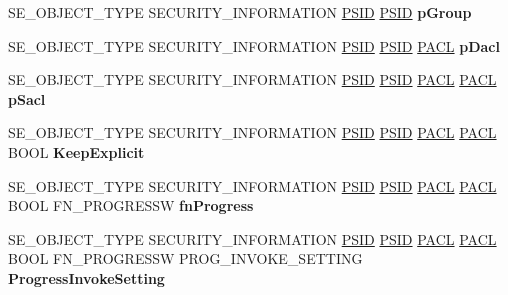 \begin{DoxyCompactItemize}
S\+E\+\_\+\+O\+B\+J\+E\+C\+T\+\_\+\+T\+Y\+PE S\+E\+C\+U\+R\+I\+T\+Y\+\_\+\+I\+N\+F\+O\+R\+M\+A\+T\+I\+ON \hyperlink{struct___s_i_d}{P\+S\+ID} \hyperlink{struct___s_i_d}{P\+S\+ID} {\bfseries p\+Group}
\item 
\mbox{\label{struct___n_t_m_a_r_t_a_a61db2cc6e9a763664329da4c149796c2}} 
S\+E\+\_\+\+O\+B\+J\+E\+C\+T\+\_\+\+T\+Y\+PE S\+E\+C\+U\+R\+I\+T\+Y\+\_\+\+I\+N\+F\+O\+R\+M\+A\+T\+I\+ON \hyperlink{struct___s_i_d}{P\+S\+ID} \hyperlink{struct___s_i_d}{P\+S\+ID} \hyperlink{struct___a_c_l}{P\+A\+CL} {\bfseries p\+Dacl}
\item 
\mbox{\label{struct___n_t_m_a_r_t_a_a284c757a1083cf78ce92b0f45cc11ccb}} 
S\+E\+\_\+\+O\+B\+J\+E\+C\+T\+\_\+\+T\+Y\+PE S\+E\+C\+U\+R\+I\+T\+Y\+\_\+\+I\+N\+F\+O\+R\+M\+A\+T\+I\+ON \hyperlink{struct___s_i_d}{P\+S\+ID} \hyperlink{struct___s_i_d}{P\+S\+ID} \hyperlink{struct___a_c_l}{P\+A\+CL} \hyperlink{struct___a_c_l}{P\+A\+CL} {\bfseries p\+Sacl}
\item 
\mbox{\label{struct___n_t_m_a_r_t_a_a7f2fd040ccc714e9d218554dcde23b1b}} 
S\+E\+\_\+\+O\+B\+J\+E\+C\+T\+\_\+\+T\+Y\+PE S\+E\+C\+U\+R\+I\+T\+Y\+\_\+\+I\+N\+F\+O\+R\+M\+A\+T\+I\+ON \hyperlink{struct___s_i_d}{P\+S\+ID} \hyperlink{struct___s_i_d}{P\+S\+ID} \hyperlink{struct___a_c_l}{P\+A\+CL} \hyperlink{struct___a_c_l}{P\+A\+CL} B\+O\+OL {\bfseries Keep\+Explicit}
\item 
\mbox{\label{struct___n_t_m_a_r_t_a_a2c616bccb7c92ddf205d409343c3cbea}} 
S\+E\+\_\+\+O\+B\+J\+E\+C\+T\+\_\+\+T\+Y\+PE S\+E\+C\+U\+R\+I\+T\+Y\+\_\+\+I\+N\+F\+O\+R\+M\+A\+T\+I\+ON \hyperlink{struct___s_i_d}{P\+S\+ID} \hyperlink{struct___s_i_d}{P\+S\+ID} \hyperlink{struct___a_c_l}{P\+A\+CL} \hyperlink{struct___a_c_l}{P\+A\+CL} B\+O\+OL F\+N\+\_\+\+P\+R\+O\+G\+R\+E\+S\+SW {\bfseries fn\+Progress}
\item 
\mbox{\label{struct___n_t_m_a_r_t_a_aac5c9f890a55fbaec1aefb7c76e86f92}} 
S\+E\+\_\+\+O\+B\+J\+E\+C\+T\+\_\+\+T\+Y\+PE S\+E\+C\+U\+R\+I\+T\+Y\+\_\+\+I\+N\+F\+O\+R\+M\+A\+T\+I\+ON \hyperlink{struct___s_i_d}{P\+S\+ID} \hyperlink{struct___s_i_d}{P\+S\+ID} \hyperlink{struct___a_c_l}{P\+A\+CL} \hyperlink{struct___a_c_l}{P\+A\+CL} B\+O\+OL F\+N\+\_\+\+P\+R\+O\+G\+R\+E\+S\+SW P\+R\+O\+G\+\_\+\+I\+N\+V\+O\+K\+E\+\_\+\+S\+E\+T\+T\+I\+NG {\bfseries Progress\+Invoke\+Setting}

\end{DoxyCompactItemize}
